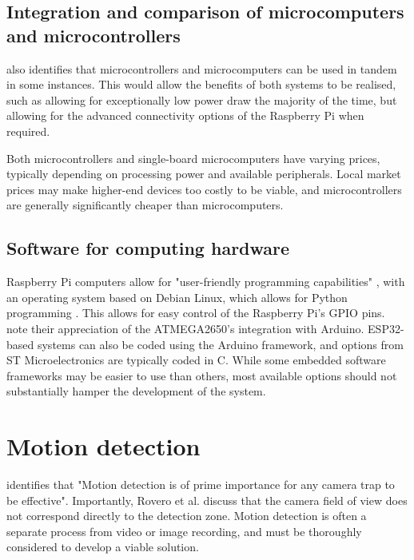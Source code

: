 \documentclass[class=report,11pt,crop=false]{standalone}
\begin{document}
\subsection{Integration and comparison of microcomputers and microcontrollers}

\cite{jolles2021broad-scale} also identifies that microcontrollers and microcomputers can be used in tandem in some instances. This would allow the benefits of both systems to be realised, such as allowing for exceptionally low power draw the majority of the time, but allowing for the advanced connectivity options of the Raspberry Pi when required.

Both microcontrollers and single-board microcomputers have varying prices, typically depending on processing power and available peripherals. Local market prices may make higher-end devices too costly to be viable, and microcontrollers are generally significantly cheaper than microcomputers.

\subsection{Software for computing hardware}

Raspberry Pi computers allow for "user-friendly programming capabilities" \cite{jolles2021broad-scale}, with an operating system based on Debian Linux, which allows for Python programming \cite{prinz2016a}. This allows for easy control of the Raspberry Pi's GPIO pins. \cite{camacho2017deployment} note their appreciation of the ATMEGA2650's integration with Arduino. ESP32-based systems can also be coded using the Arduino framework, and options from ST Microelectronics are typically coded in C. While some embedded software frameworks may be easier to use than others, most available options should not substantially hamper the development of the system.

\section{Motion detection}

\cite{meek2012user} identifies that "Motion detection is of prime importance for any camera trap to be effective". Importantly, Rovero et al. \cite{rovero2013which} discuss that the camera field of view does not correspond directly to the detection zone. Motion detection is often a separate process from video or image recording, and must be thoroughly considered to develop a viable solution.
\end{document}
